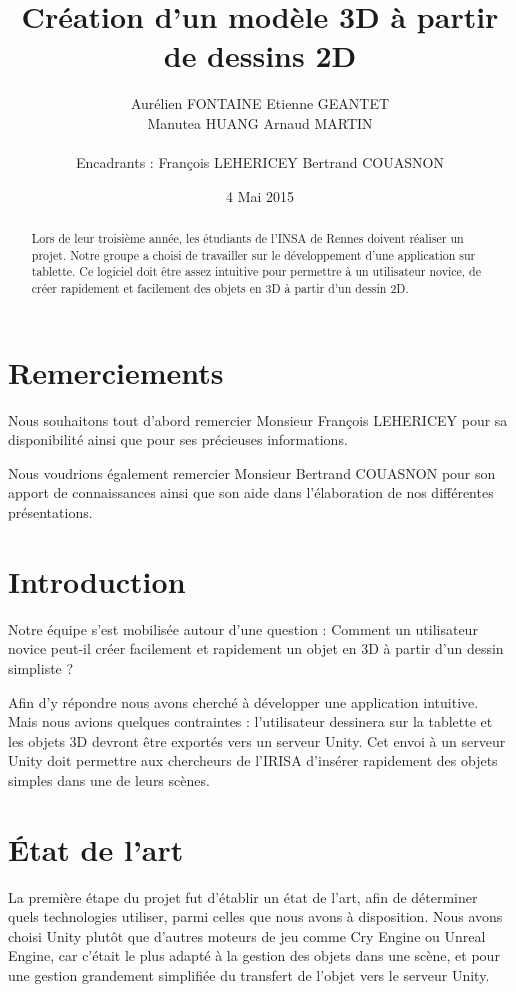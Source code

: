 \documentclass[a4paper,11pt]{article}
\title{ \textbf{Création d'un modèle 3D à partir de dessins 2D} }
\author{ Aurélien \textsc{FONTAINE} Etienne \textsc{GEANTET} \\
	Manutea \textsc{HUANG} Arnaud \textsc{MARTIN} \\
	\\
	Encadrants : François \textsc{LEHERICEY}	Bertrand \textsc{COUASNON}}
\date{4 Mai 2015}                    %
\begin{document}
\maketitle                 %
\thispagestyle{empty}      %

\begin{abstract}
	Lors de leur troisième année, les étudiants de l'INSA de Rennes doivent réaliser un projet. Notre groupe a choisi de travailler sur le développement d'une application sur tablette. Ce logiciel doit être assez intuitive pour permettre à un utilisateur novice, de créer rapidement et facilement des objets en 3D à partir d'un dessin 2D.
\end{abstract}
	
	\section{Remerciements}
		Nous souhaitons tout d'abord remercier Monsieur François LEHERICEY pour sa disponibilité ainsi que pour ses précieuses informations.
		
		Nous voudrions également remercier Monsieur Bertrand COUASNON pour son apport de connaissances ainsi que son aide dans l'élaboration de nos différentes présentations.
		
	\newpage %
	
	\section{Introduction} %
		Notre équipe s'est mobilisée autour d'une question : Comment un utilisateur novice peut-il créer facilement et rapidement un objet en 3D à partir d'un dessin simpliste ?
		
		Afin d'y répondre nous avons cherché à développer une application intuitive. Mais nous avions quelques contraintes : l'utilisateur dessinera sur la tablette et les objets 3D devront être exportés vers un serveur Unity. Cet envoi à un serveur Unity doit permettre aux chercheurs de l'IRISA d'insérer rapidement des objets simples dans une de leurs scènes.
	\section{État de l'art}
		La première étape du projet fut d'établir un état de l'art, afin de déterminer quels technologies utiliser, parmi celles que nous avons à disposition. Nous avons choisi Unity plutôt que d'autres moteurs de jeu comme Cry Engine ou Unreal Engine, car c'était le plus adapté à la gestion des objets dans une scène, et pour une gestion grandement simplifiée du transfert de l'objet vers le serveur Unity. 
		
\end{document}
